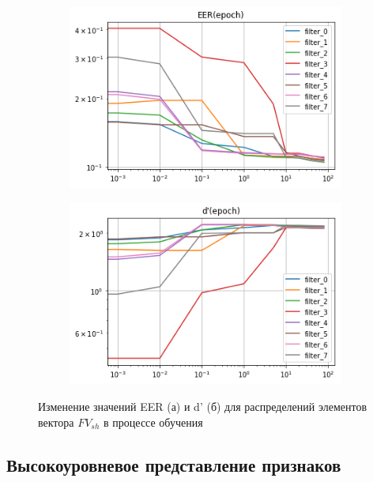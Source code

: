 \begin{figure}[!h]
	\begin{subfigure}{.5\textwidth}
		\centering
		\includegraphics[width=0.95\columnwidth]{pictures/eer_epochs.png}
		\caption{}
		\label{fig:eer_epochs}
	\end{subfigure}%
	\begin{subfigure}{.5\textwidth}
		\centering
		\includegraphics[width=0.95\columnwidth]{pictures/dprime_epochs.png}
		\caption{}
		\label{fig:dprime_epochs}
	\end{subfigure}%
	\caption{Изменение значений EER (а) и d' (б) для распределений элементов вектора $FV_{sh}$ в процессе обучения}
	\label{fig:eer_dprime_epochs}
\end{figure}

\subsection{Высокоуровневое представление признаков}
\label{sec:fem-nn-deepfv}

